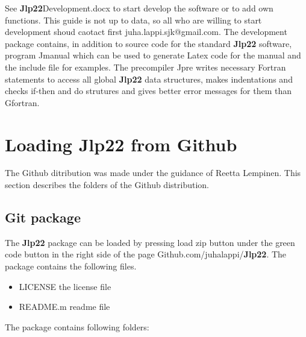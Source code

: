  
See \textbf{Jlp22}Development.docx to start develop the software or to add 
own functions. This guide is not up to data, so all who are willing to start development shoud 
caotact first juha.lappi.sjk@gmail.com. The development package contains, in addition to source code for 
the standard \textbf{Jlp22} software, program Jmanual 
which can be used to generate Latex code for the manual and the include file for 
examples.   The precompiler Jpre  writes necessary Fortran statements to access all global 
\textbf{Jlp22} data structures, makes indentations and checks if-then and do strutures and gives 
better error messages for them than Gfortran. 
\section{ Loading \textbf{Jlp22} from Github} 
\label{git} 
The Github ditribution was made under the guidance of Reetta Lempinen. This section describes the 
folders of the Github distribution. 
\subsection{Git package} 
\label{gitpack} 
The \textbf{Jlp22}  package can be loaded by pressing load zip button under the green 
code button in the right side of the page Github.com/juhalappi/\textbf{Jlp22}.  The package 
contains the following files. 
 
\begin{itemize} 
\item LICENSE the license file 
\item README.m readme file 
\end{itemize} 
 
The package contains following folders: 
 

